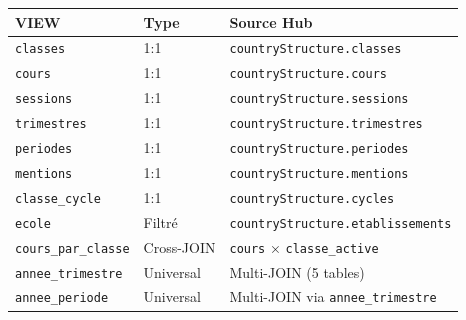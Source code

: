 \documentclass[12pt,a4paper,oneside]{report}
\begin{document}
\begin{center}
\begin{tabularx}{\textwidth}{l l X}
\toprule
\textbf{VIEW} & \textbf{Type} & \textbf{Source Hub} \\
\midrule
\texttt{classes} & 1:1 & \texttt{countryStructure.classes} \\
\texttt{cours} & 1:1 & \texttt{countryStructure.cours} \\
\texttt{sessions} & 1:1 & \texttt{countryStructure.sessions} \\
\texttt{trimestres} & 1:1 & \texttt{countryStructure.trimestres} \\
\texttt{periodes} & 1:1 & \texttt{countryStructure.periodes} \\
\texttt{mentions} & 1:1 & \texttt{countryStructure.mentions} \\
\texttt{classe\_cycle} & 1:1 & \texttt{countryStructure.cycles} \\
\texttt{ecole} & Filtré & \texttt{countryStructure.etablissements} \\
\texttt{cours\_par\_classe} & Cross-JOIN & \texttt{cours} × \texttt{classe\_active} \\
\texttt{annee\_trimestre} & Universal & Multi-JOIN (5 tables) \\
\texttt{annee\_periode} & Universal & Multi-JOIN via \texttt{annee\_trimestre} \\
\bottomrule
\end{tabularx}
\end{center}
\end{document}
